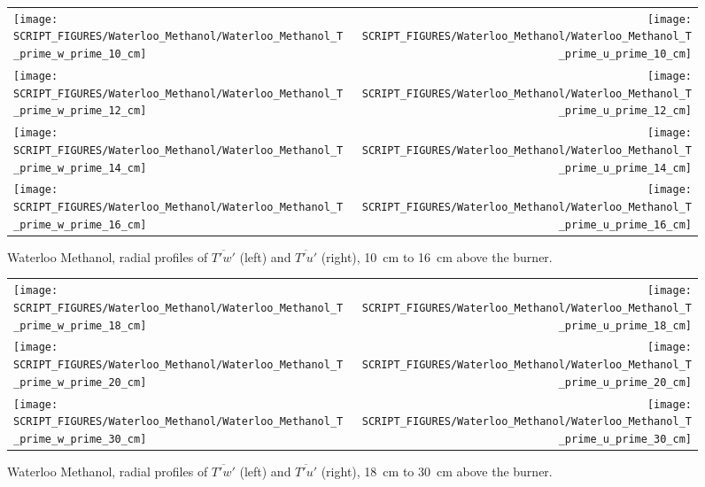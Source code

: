 \begin{figure}[p]
\begin{tabular*}{\textwidth}{l@{\extracolsep{\fill}}r}
\texttt{[image: SCRIPT\_FIGURES/Waterloo\_Methanol/Waterloo\_Methanol\_T\_prime\_w\_prime\_10\_cm]} &
\texttt{[image: SCRIPT\_FIGURES/Waterloo\_Methanol/Waterloo\_Methanol\_T\_prime\_u\_prime\_10\_cm]} \\
\texttt{[image: SCRIPT\_FIGURES/Waterloo\_Methanol/Waterloo\_Methanol\_T\_prime\_w\_prime\_12\_cm]} &
\texttt{[image: SCRIPT\_FIGURES/Waterloo\_Methanol/Waterloo\_Methanol\_T\_prime\_u\_prime\_12\_cm]} \\
\texttt{[image: SCRIPT\_FIGURES/Waterloo\_Methanol/Waterloo\_Methanol\_T\_prime\_w\_prime\_14\_cm]} &
\texttt{[image: SCRIPT\_FIGURES/Waterloo\_Methanol/Waterloo\_Methanol\_T\_prime\_u\_prime\_14\_cm]} \\
\texttt{[image: SCRIPT\_FIGURES/Waterloo\_Methanol/Waterloo\_Methanol\_T\_prime\_w\_prime\_16\_cm]} &
\texttt{[image: SCRIPT\_FIGURES/Waterloo\_Methanol/Waterloo\_Methanol\_T\_prime\_u\_prime\_16\_cm]}
\end{tabular*}
\caption[Waterloo Methanol, radial profiles of $\overline{T'w'}$ and $\overline{T'u'}$, 10~cm to 16~cm above the burner]
{Waterloo Methanol, radial profiles of $\overline{T'w'}$ (left) and $\overline{T'u'}$ (right), 10~cm to 16~cm above the burner.}
\label{Water_Methanol_Tpwp_2}
\end{figure}

\begin{figure}[p]
\begin{tabular*}{\textwidth}{l@{\extracolsep{\fill}}r}
\texttt{[image: SCRIPT\_FIGURES/Waterloo\_Methanol/Waterloo\_Methanol\_T\_prime\_w\_prime\_18\_cm]} &
\texttt{[image: SCRIPT\_FIGURES/Waterloo\_Methanol/Waterloo\_Methanol\_T\_prime\_u\_prime\_18\_cm]} \\
\texttt{[image: SCRIPT\_FIGURES/Waterloo\_Methanol/Waterloo\_Methanol\_T\_prime\_w\_prime\_20\_cm]} &
\texttt{[image: SCRIPT\_FIGURES/Waterloo\_Methanol/Waterloo\_Methanol\_T\_prime\_u\_prime\_20\_cm]} \\
\texttt{[image: SCRIPT\_FIGURES/Waterloo\_Methanol/Waterloo\_Methanol\_T\_prime\_w\_prime\_30\_cm]} &
\texttt{[image: SCRIPT\_FIGURES/Waterloo\_Methanol/Waterloo\_Methanol\_T\_prime\_u\_prime\_30\_cm]}
\end{tabular*}
\caption[Waterloo Methanol, radial profiles of $\overline{T'w'}$ and $\overline{T'u'}$, 18~cm to 30~cm above the burner]
{Waterloo Methanol, radial profiles of $\overline{T'w'}$ (left) and $\overline{T'u'}$ (right), 18~cm to 30~cm above the burner.}
\label{Water_Methanol_Tpwp_3}
\end{figure}



